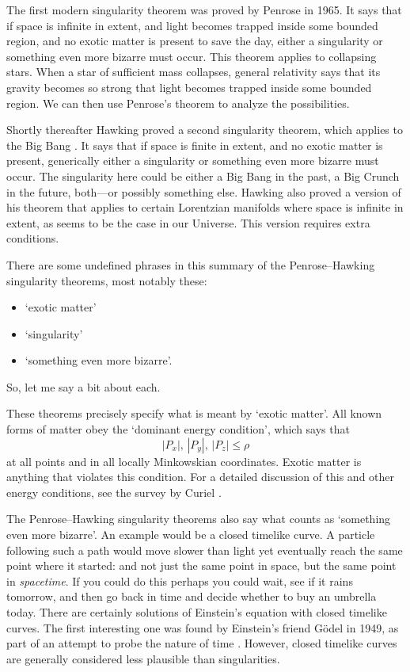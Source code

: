 \documentclass{article}
\begin{document}
The first modern singularity theorem was proved by Penrose \cite{Penrose1965} in 1965.  It says that if space is infinite in extent, and light becomes trapped inside some bounded region, and no exotic matter is present to save the day, either a singularity or something even more bizarre must occur.   This theorem applies to collapsing stars.   When a star of sufficient mass collapses, general relativity says that its gravity becomes so strong that light becomes trapped inside some bounded region.   We can then use Penrose's theorem to analyze the possibilities.

Shortly thereafter Hawking proved a second singularity theorem, which applies to the Big Bang \cite{Hawking1966}.   It says that if space is finite in extent, and no exotic matter is present, generically either a singularity or something even more bizarre must occur.  The singularity here could be either a Big Bang in the past, a Big Crunch in the future, both---or possibly something else.  Hawking also proved a version of his theorem that applies to certain Lorentzian manifolds where space is infinite in extent, as seems to be the case in our Universe.  This version requires extra conditions.

There are some undefined phrases in this summary of the Penrose--Hawking singularity theorems, most notably these:
\begin{itemize}
\item `exotic matter'
\item `singularity'
\item `something even more bizarre'.
\end{itemize}
So, let me say a bit about each.

These theorems precisely specify what is meant by `exotic matter'.  All known forms of matter obey the `dominant energy condition', which says that
\[       |P_x|, \, |P_y|, \, |P_z| \le \rho \]
at all points and in all locally Minkowskian coordinates.  Exotic matter is anything that violates this condition.  For a detailed discussion of this and other energy conditions, see the survey by Curiel \cite{Curiel}.

The Penrose--Hawking singularity theorems also say what counts as `something even more bizarre'.  An example would be a closed timelike curve.   A particle following such a path would move slower than light yet eventually reach the same point where it started: and not just the same point in space, but the same point in \emph{spacetime}.  If you could do this perhaps you could wait, see if it rains tomorrow, and then go back in time and decide whether to buy an umbrella today.  There are certainly solutions of Einstein's equation with closed timelike curves.  The first interesting one was found by Einstein's friend G\"odel in 1949, as part of an attempt to probe the nature of time \cite{Goedel}.  However, closed timelike curves are generally considered less plausible than singularities.
\end{document}

